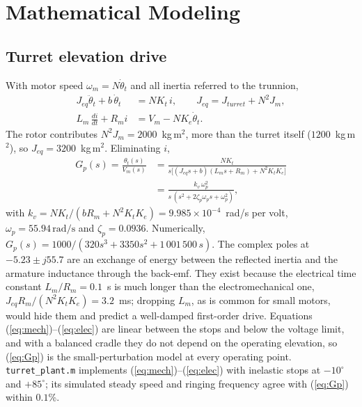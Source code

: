 \documentclass[conference]{IEEEtran}
\newcommand{\rads}{\,\mathrm{rad/s}}
\begin{document}
\section{Mathematical Modeling}
\subsection{Turret elevation drive}
With motor speed $\omega_m=N\dot\theta_t$ and all inertia referred to the trunnion,
\begin{align}
J_{eq}\ddot\theta_t+b\,\dot\theta_t&=NK_t\,i, \qquad J_{eq}=J_{turret}+N^2J_m, \label{eq:mech}\\
L_m\,\frac{di}{dt}+R_m i&=V_m-NK_e\dot\theta_t . \label{eq:elec}
\end{align}
The rotor contributes $N^2J_m=2000$~kg\,m$^2$, more than the turret itself ($1200$~kg\,m$^2$), so $J_{eq}=3200$~kg\,m$^2$. Eliminating $i$,
\begin{align}
G_p(s)=\frac{\theta_t(s)}{V_m(s)}&=\frac{NK_t}{s\big[(J_{eq}s+b)(L_ms+R_m)+N^2K_tK_e\big]}\nonumber\\
&=\frac{k_v\,\omega_p^2}{s\,(s^2+2\zeta_p\omega_ps+\omega_p^2)},
\label{eq:Gp}
\end{align}
with $k_v=NK_t/(bR_m+N^2K_tK_e)=9.985\times10^{-4}$~rad/s per volt, $\omega_p=55.94\rads$ and $\zeta_p=0.0936$. Numerically, $G_p(s)=1000/(320s^3+3350s^2+1\,001\,500\,s)$. The complex poles at $-5.23\pm j55.7$ are an exchange of energy between the reflected inertia and the armature inductance through the back-emf. They exist because the electrical time constant $L_m/R_m=0.1$~s is much longer than the electromechanical one, $J_{eq}R_m/(N^2K_tK_e)=3.2$~ms; dropping $L_m$, as is common for small motors, would hide them and predict a well-damped first-order drive. Equations (\ref{eq:mech})--(\ref{eq:elec}) are linear between the stops and below the voltage limit, and with a balanced cradle they do not depend on the operating elevation, so (\ref{eq:Gp}) is the small-perturbation model at every operating point. \texttt{turret\_plant.m} implements (\ref{eq:mech})--(\ref{eq:elec}) with inelastic stops at $-10^\circ$ and $+85^\circ$; its simulated steady speed and ringing frequency agree with (\ref{eq:Gp}) within $0.1$\%.
\end{document}
